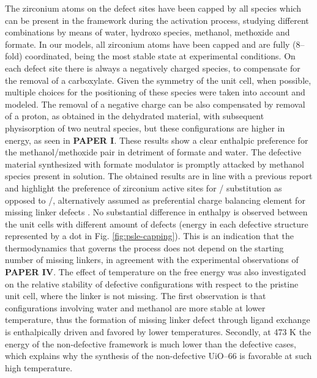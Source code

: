 \npar
The zirconium atoms on the defect sites have been capped by all species which can be present in the framework during the activation process, studying different combinations by means of water, hydroxo species, methanol, methoxide and formate. In our models, all zirconium atoms have been capped and are fully (8--fold) coordinated, being the most stable state at experimental conditions. On each defect site there is always a negatively charged species, to compensate for the removal of a carboxylate. Given the symmetry of the unit cell, when possible, multiple choices for the positioning of these species were taken into account and modeled. The removal of a negative charge can be also compensated by removal of a proton, as obtained in the dehydrated material, with subsequent physisorption of two neutral species, but these configurations are higher in energy, as seen in \textbf{PAPER I}. These results show a clear enthalpic preference for the methanol/methoxide pair in detriment of formate and water. The defective material synthesized with formate modulator is promptly attacked by methanol species present in solution. The obtained results are in line with a previous report \cite{yang2016tuning} and highlight the preference of zirconium active sites for / substitution as opposed to /, alternatively assumed as preferential charge balancing element for missing linker defects \cite{trickett2015definitive, ling2016dynamic}. No substantial difference in enthalpy is observed between the unit cells with different amount of defects (energy in each defective structure represented by a dot in Fig. \ref{fig:psle-capping}). This is an indication that the thermodynamics that governs the process does not depend on the starting number of missing linkers, in agreement with the experimental observations of \textbf{PAPER IV}. The effect of temperature on the free energy was also investigated on the relative stability of defective configurations with respect to the pristine unit cell, where the linker is not missing. The first observation is that configurations involving water and methanol are more stable at lower temperature, thus the formation of missing linker defect through ligand exchange is enthalpically driven and favored by lower temperatures. Secondly, at 473 K the energy of the non-defective framework is much lower than the defective cases, which explains why the synthesis of the non-defective UiO--66 is favorable at such high temperature\cite{shearer2014tuned}.

